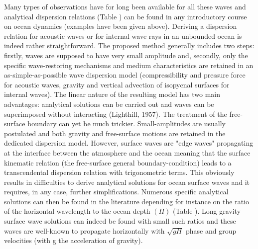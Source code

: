 \documentclass[a4paper,11pt]{article}
\begin{document}
Many types of observations have for long been available for all these waves and analytical dispersion relations (Table ) can be found in any introductory course on ocean dynamics (examples have been given above). Deriving a dispersion relation for acoustic waves or for internal wave rays in an unbounded ocean is indeed rather straightforward. The proposed method generally includes two steps: firstly, waves are supposed to have very small amplitude and, secondly, only the specific wave-restoring mechanisms and medium characteristics are retained in an as-simple-as-possible wave dispersion model (compressibility and pressure force for acoustic waves, gravity and vertical advection of isopycnal surfaces for internal waves). The linear nature of the resulting model has two main advantages: analytical solutions can be carried out and waves can be superimposed without interacting (Lighthill, 1957).
The treatment of the free-surface boundary can yet be much trickier. Small-amplitudes are usually postulated and both gravity and free-surface motions are retained in the dedicated dispersion model. However, surface waves are "edge waves" propagating at the interface between the atmosphere and the ocean meaning that the surface kinematic relation (the free-surface general boundary-condition) leads to a transcendental dispersion relation with trigonometric terms. This obviously results in difficulties to derive analytical solutions for ocean surface waves and it requires, in any case, further simplifications. Numerous specific analytical solutions can then be found in the literature depending for instance on the ratio of the horizontal wavelength to the ocean depth $(H)$ (Table ). Long gravity surface wave solutions can indeed be found with small such ratios and these waves are well-known to propagate horizontally with $\sqrt{g H}$ phase and group velocities (with g the acceleration of gravity).\\
\end{document}
